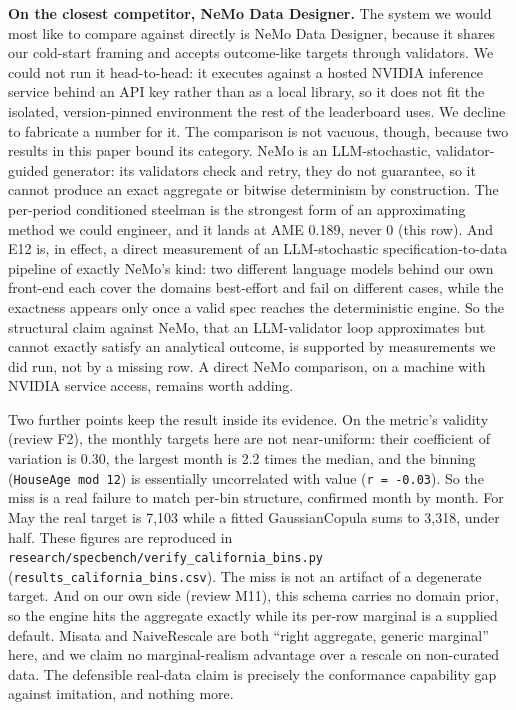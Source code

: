 \textbf{On the closest competitor, NeMo Data Designer.} The system we
would most like to compare against directly is NeMo Data Designer,
because it shares our cold-start framing and accepts outcome-like
targets through validators. We could not run it head-to-head: it
executes against a hosted NVIDIA inference service behind an API key
rather than as a local library, so it does not fit the isolated,
version-pinned environment the rest of the leaderboard uses. We decline
to fabricate a number for it. The comparison is not vacuous, though,
because two results in this paper bound its category. NeMo is an
LLM-stochastic, validator-guided generator: its validators check and
retry, they do not guarantee, so it cannot produce an exact aggregate or
bitwise determinism by construction. The per-period conditioned steelman
is the strongest form of an approximating method we could engineer, and
it lands at AME 0.189, never 0 (this row). And E12 is, in effect, a
direct measurement of an LLM-stochastic specification-to-data pipeline
of exactly NeMo's kind: two different language models behind our own
front-end each cover the domains best-effort and fail on different
cases, while the exactness appears only once a valid spec reaches the
deterministic engine. So the structural claim against NeMo, that an
LLM-validator loop approximates but cannot exactly satisfy an analytical
outcome, is supported by measurements we did run, not by a missing row.
A direct NeMo comparison, on a machine with NVIDIA service access,
remains worth adding.

Two further points keep the result inside its evidence. On the metric's
validity (review F2), the monthly targets here are not near-uniform:
their coefficient of variation is 0.30, the largest month is 2.2 times
the median, and the binning (\texttt{HouseAge\ mod\ 12}) is essentially
uncorrelated with value (\texttt{r\ =\ -0.03}). So the miss is a real
failure to match per-bin structure, confirmed month by month. For May
the real target is 7,103 while a fitted GaussianCopula sums to 3,318,
under half. These figures are reproduced in
\texttt{research/\allowbreak{}specbench/\allowbreak{}verify\_\allowbreak{}california\_\allowbreak{}bins.py}
(\texttt{results\_\allowbreak{}california\_\allowbreak{}bins.csv}). The miss is not an artifact of
a degenerate target. And on our own side (review M11), this schema
carries no domain prior, so the engine hits the aggregate exactly while
its per-row marginal is a supplied default. Misata and NaiveRescale are
both ``right aggregate, generic marginal'' here, and we claim no
marginal-realism advantage over a rescale on non-curated data. The
defensible real-data claim is precisely the conformance capability gap
against imitation, and nothing more.

